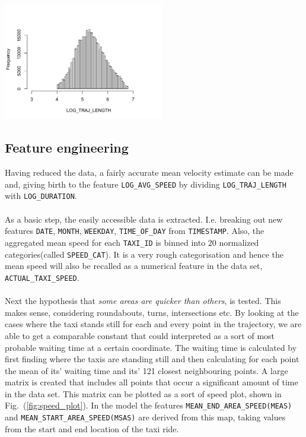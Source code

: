\documentclass{article}
\newenvironment{Figure}
{\par\medskip\noindent\minipage{\linewidth}}
{\endminipage\par\medskip}
\begin{document}
\begin{multicols}{2}
\begin{Figure}
    \centering
    \includegraphics[width=7cm]{plot_tl2.png}
    \label{fig:plot_tl2}
\end{Figure}

\subsection{Feature engineering}
Having reduced the data, a fairly accurate mean velocity estimate can be made and, giving birth to the feature \texttt{LOG\_AVG\_SPEED} by dividing \texttt{LOG\_TRAJ\_LENGTH} with \texttt{LOG\_DURATION}.\\ \\
As a basic step, the easily accessible data is extracted. I.e. breaking out new features \texttt{DATE}, \texttt{MONTH}, \texttt{WEEKDAY}, \texttt{TIME\_OF\_DAY} from \texttt{TIMESTAMP}. Also, the aggregated mean speed for each \texttt{TAXI\_ID} is binned into 20 normalized categories(called \texttt{SPEED\_CAT}). It is a very rough categorisation and hence the mean speed will also be recalled as a numerical feature in the data set, \texttt{ACTUAL\_TAXI\_SPEED}.\\ \\
Next the hypothesis that \textit{some areas are quicker than others}, is tested. This makes sense, considering roundabouts, turns, intersections etc. By looking at the cases where the taxi stands still for each and every point in the trajectory, we are able to get a comparable constant that could interpreted as a sort of most probable waiting time at a certain coordinate. The waiting time is calculated by first finding where the taxis are standing still and then calculating for each point the mean of its' waiting time and its' 121 closest neighbouring points. A large matrix is created that includes all points that occur a significant amount of time in the data set. This matrix can be plotted as a sort of speed plot, shown in Fig.\ (\ref{fig:speed_plot}). In the model the features \texttt{MEAN\_END\_AREA\_SPEED(MEAS)} and \texttt{MEAN\_START\_AREA\_SPEED(MSAS)} are derived from this map, taking values from the start and end location of the taxi ride.

\end{multicols}
\end{document}
